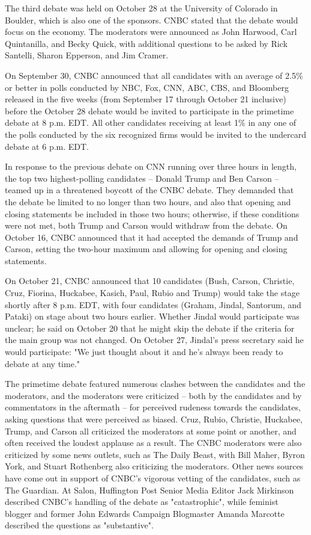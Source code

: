 The third debate was held on October 28 at the University of Colorado in
Boulder, which is also one of the sponsors. CNBC stated that the debate
would focus on the economy. The moderators were announced as John
Harwood, Carl Quintanilla, and Becky Quick, with additional questions to
be asked by Rick Santelli, Sharon Epperson, and Jim Cramer.

On September 30, CNBC announced that all candidates with an average of
2.5\% or better in polls conducted by NBC, Fox, CNN, ABC, CBS, and
Bloomberg released in the five weeks (from September 17 through October
21 inclusive) before the October 28 debate would be invited to
participate in the primetime debate at 8 p.m. EDT. All other candidates
receiving at least 1\% in any one of the polls conducted by the six
recognized firms would be invited to the undercard debate at 6 p.m. EDT.

In response to the previous debate on CNN running over three hours in
length, the top two highest-polling candidates -- Donald Trump and Ben
Carson -- teamed up in a threatened boycott of the CNBC debate. They
demanded that the debate be limited to no longer than two hours, and
also that opening and closing statements be included in those two hours;
otherwise, if these conditions were not met, both Trump and Carson would
withdraw from the debate. On October 16, CNBC announced that it had
accepted the demands of Trump and Carson, setting the two-hour maximum
and allowing for opening and closing statements.

On October 21, CNBC announced that 10 candidates (Bush, Carson,
Christie, Cruz, Fiorina, Huckabee, Kasich, Paul, Rubio and Trump) would
take the stage shortly after 8 p.m. EDT, with four candidates (Graham,
Jindal, Santorum, and Pataki) on stage about two hours earlier. Whether
Jindal would participate was unclear; he said on October 20 that he
might skip the debate if the criteria for the main group was not
changed. On October 27, Jindal's press secretary said he would
participate: "We just thought about it and he's always been ready to
debate at any time."

The primetime debate featured numerous clashes between the candidates
and the moderators, and the moderators were criticized -- both by the
candidates and by commentators in the aftermath -- for perceived
rudeness towards the candidates, asking questions that were perceived as
biased. Cruz, Rubio, Christie, Huckabee, Trump, and Carson all
criticized the moderators at some point or another, and often received
the loudest applause as a result. The CNBC moderators were also
criticized by some news outlets, such as The Daily Beast, with Bill
Maher, Byron York, and Stuart Rothenberg also criticizing the
moderators. Other news sources have come out in support of CNBC's
vigorous vetting of the candidates, such as The Guardian. At Salon,
Huffington Post Senior Media Editor Jack Mirkinson described CNBC's
handling of the debate as "catastrophic", while feminist blogger and
former John Edwards Campaign Blogmaster Amanda Marcotte described the
questions as "substantive".

